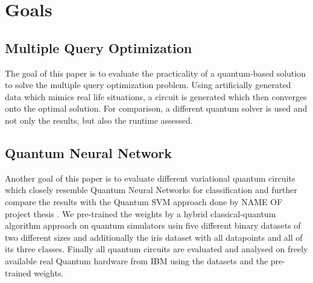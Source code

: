 \section{Goals}

\subsection{Multiple Query Optimization}
The goal of this paper is to evaluate the practicality of a quantum-based solution to solve the multiple query optimization problem. Using artificially generated data which mimics real life situations, a circuit is generated which then converges onto the optimal solution. For comparison, a different quantum solver is used and not only the results, but also the runtime assessed.

\subsection{Quantum Neural Network}
Another goal of this paper is to evaluate different variational quantum circuits which closely resemble Quantum Neural Networks for classification and further compare the results with the Quantum SVM approach done by NAME OF project thesis . We pre-trained the weights by a hybrid classical-quantum algorithm approach on quantum simulators usin five different binary datasets of two different sizes and additionally the iris dataset with all datapoints and all of its three classes. Finally all quantum circuits are evaluated and analysed on freely available real Quantum hardware from IBM using the datasets and the pre-trained weights.

\clearpage
